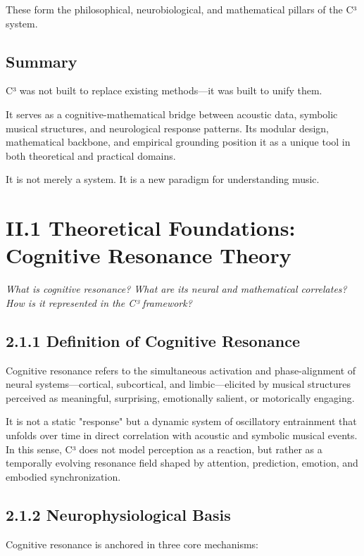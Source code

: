 \documentclass[10pt]{article}
\begin{document}
These form the philosophical, neurobiological, and mathematical pillars of the C³ system.

\subsection*{Summary}

C³ was not built to replace existing methods—it was built to unify them.

It serves as a cognitive-mathematical bridge between acoustic data, symbolic musical structures, and neurological response patterns. Its modular design, mathematical backbone, and empirical grounding position it as a unique tool in both theoretical and practical domains.

It is not merely a system. It is a new paradigm for understanding music.

\section*{II.1 Theoretical Foundations: Cognitive Resonance Theory}

\textit{What is cognitive resonance? What are its neural and mathematical correlates? How is it represented in the C³ framework?}

\subsection*{2.1.1 Definition of Cognitive Resonance}

Cognitive resonance refers to the simultaneous activation and phase-alignment of neural systems—cortical, subcortical, and limbic—elicited by musical structures perceived as meaningful, surprising, emotionally salient, or motorically engaging.

It is not a static "response" but a dynamic system of oscillatory entrainment that unfolds over time in direct correlation with acoustic and symbolic musical events. In this sense, C³ does not model perception as a reaction, but rather as a temporally evolving resonance field shaped by attention, prediction, emotion, and embodied synchronization.

\subsection*{2.1.2 Neurophysiological Basis}

Cognitive resonance is anchored in three core mechanisms:
\end{document}

